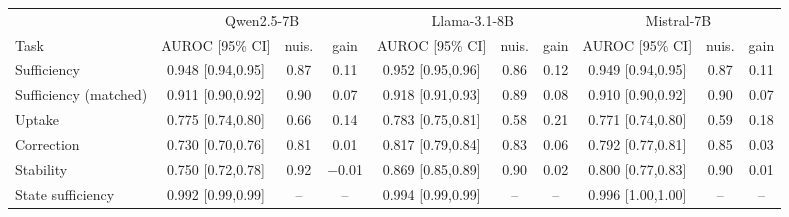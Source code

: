 \begin{tabular}{lccccccccc}
\toprule
& \multicolumn{3}{c}{Qwen2.5-7B} & \multicolumn{3}{c}{Llama-3.1-8B} & \multicolumn{3}{c}{Mistral-7B} \\
\cmidrule(lr){2-4}\cmidrule(lr){5-7}\cmidrule(lr){8-10}
Task & AUROC [95\% CI] & nuis. & gain & AUROC [95\% CI] & nuis. & gain & AUROC [95\% CI] & nuis. & gain \\
\midrule
Sufficiency & 0.948 [0.94,0.95] & 0.87 & 0.11 & 0.952 [0.95,0.96] & 0.86 & 0.12 & 0.949 [0.94,0.95] & 0.87 & 0.11 \\
Sufficiency (matched) & 0.911 [0.90,0.92] & 0.90 & 0.07 & 0.918 [0.91,0.93] & 0.89 & 0.08 & 0.910 [0.90,0.92] & 0.90 & 0.07 \\
Uptake & 0.775 [0.74,0.80] & 0.66 & 0.14 & 0.783 [0.75,0.81] & 0.58 & 0.21 & 0.771 [0.74,0.80] & 0.59 & 0.18 \\
Correction & 0.730 [0.70,0.76] & 0.81 & 0.01 & 0.817 [0.79,0.84] & 0.83 & 0.06 & 0.792 [0.77,0.81] & 0.85 & 0.03 \\
Stability & 0.750 [0.72,0.78] & 0.92 & $-$0.01 & 0.869 [0.85,0.89] & 0.90 & 0.02 & 0.800 [0.77,0.83] & 0.90 & 0.01 \\
State sufficiency & 0.992 [0.99,0.99] & -- & -- & 0.994 [0.99,0.99] & -- & -- & 0.996 [1.00,1.00] & -- & -- \\
\bottomrule
\end{tabular}